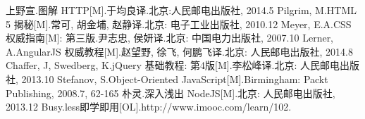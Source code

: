 
\begin{thesisbibliography}
   上野宣.图解 HTTP[M].于均良译.北京:人民邮电出版社, 2014.5
   Pilgrim, M.HTML 5 揭秘[M].常可, 胡金埔, 赵静译.北京: 电子工业出版社, 2010.12
   Meyer, E.A.CSS 权威指南[M]: 第三版.尹志忠, 侯妍译.北京: 中国电力出版社, 2007.10
   Lerner, A.AngularJS 权威教程[M].赵望野, 徐飞, 何鹏飞译.北京: 人民邮电出版社, 2014.8
   Chaffer, J, Swedberg, K.jQuery 基础教程: 第4版[M].李松峰译.北京: 人民邮电出版社, 2013.10
   Stefanov, S.Object-Oriented JavaScript[M].Birmingham: Packt Publishing, 2008.7, 62-165
   朴灵.深入浅出 NodeJS[M].北京: 人民邮电出版社, 2013.12
   Busy.less即学即用[OL].http://www.imooc.com/learn/102.
\end{thesisbibliography}

